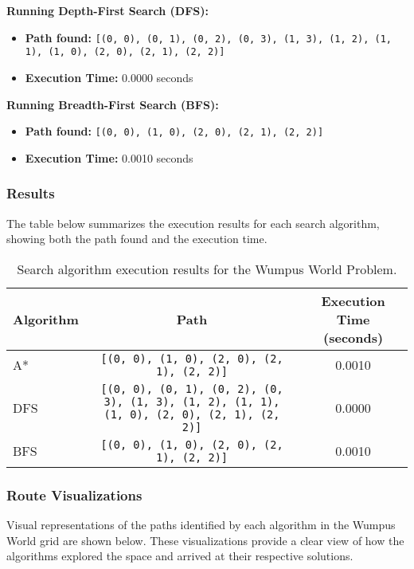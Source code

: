 \documentclass[12pt]{article}
\begin{document}
\textbf{Running Depth-First Search (DFS):}
\begin{itemize}
    \item \textbf{Path found:} \texttt{[(0, 0), (0, 1), (0, 2), (0, 3), (1, 3), (1, 2), (1, 1), (1, 0), (2, 0), (2, 1), (2, 2)]}
    \item \textbf{Execution Time:} 0.0000 seconds
\end{itemize}

\textbf{Running Breadth-First Search (BFS):}
\begin{itemize}
    \item \textbf{Path found:} \texttt{[(0, 0), (1, 0), (2, 0), (2, 1), (2, 2)]}
    \item \textbf{Execution Time:} 0.0010 seconds
\end{itemize}

\subsubsection{Results}

The table below summarizes the execution results for each search algorithm, showing both the path found and the execution time.

\begin{table}[h!]
\centering
\begin{tabular}{|l|c|c|}
\hline
\textbf{Algorithm} & \textbf{Path} & \textbf{Execution Time (seconds)} \\
\hline
A* & \texttt{[(0, 0), (1, 0), (2, 0), (2, 1), (2, 2)]} & 0.0010 \\
DFS & \texttt{[(0, 0), (0, 1), (0, 2), (0, 3), (1, 3), (1, 2), (1, 1), (1, 0), (2, 0), (2, 1), (2, 2)]} & 0.0000 \\
BFS & \texttt{[(0, 0), (1, 0), (2, 0), (2, 1), (2, 2)]} & 0.0010 \\
\hline
\end{tabular}
\caption{Search algorithm execution results for the Wumpus World Problem.}
\label{tab:wumpus_search_performance}
\end{table}

\subsubsection{Route Visualizations}

Visual representations of the paths identified by each algorithm in the Wumpus World grid are shown below. These visualizations provide a clear view of how the algorithms explored the space and arrived at their respective solutions.
\end{document}
